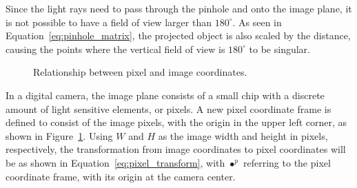 Since the light rays need to pass through the pinhole and onto the image plane, it is not possible to have a field of view larger than $180^\circ$. As seen in Equation~\eqref{eq:pinhole_matrix}, the projected object is also scaled by the distance, causing the points where the vertical field of view is $180^\circ$ to be singular. 

\begin{figure}[!htb]
    \centering
    
    \caption{Relationship between pixel and image coordinates.}
    \label{fig:rel_img_pixel}
\end{figure}

In a digital camera, the image plane consists of a small chip with a discrete amount of light sensitive elements, or pixels. A new pixel coordinate frame is defined to consist of the image pixels, with the origin in the upper left corner, as shown in Figure~\ref{fig:rel_img_pixel}. Using $W$ and $H$ as the image width and height in pixels, respectively, the transformation from image coordinates to pixel coordinates will be as shown in Equation~\eqref{eq:pixel_transform}, with $\bullet^p$ referring to the pixel coordinate frame, with its origin at the camera center.

